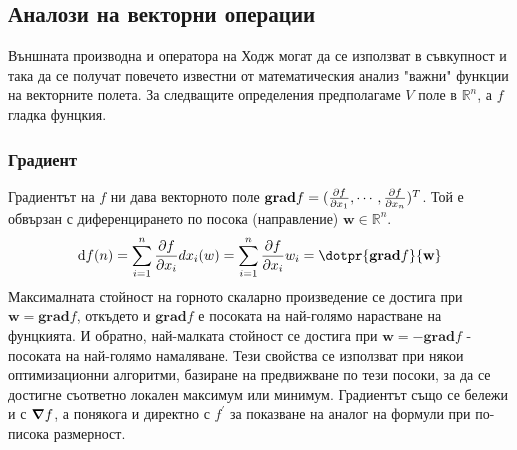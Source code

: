 \documentclass[12pt]{article}
\begin{document}
\begin{large}
\subsection{Аналози на векторни операции}
Външната производна и оператора на Ходж могат да се използват в съвкупност и така да се получат повечето известни от математическия анализ "важни" функции на векторните полета.
За следващите определения предполагаме $V$ поле в $\mathbb{R}^n$, а $f$ гладка фунцкия.

\subsubsection*{Градиент}
Градиентът на $f$ ни дава векторното поле $\mathbf{grad} f=(\pdv{f}{x_1},\cdots,\pdv{f}{x_n})^T$. Той е обвързан с диференцирането по посока (направление) $\mathbf{w} \in \mathbb{R}^n$.
\[
  \dd f(n)=\sum_{i=1}^{n} \pdv{f}{x_i}dx_i(w)=\sum_{i=1}^{n} \pdv{f}{x_i}w_i=\dotpr{\mathbf{grad}f}{\mathbf{w}}
  \]
Максималната стойност на горното скаларно произведение се достига при $\mathbf{w}=\mathbf{grad}f$, откъдето и $\mathbf{grad}f$ е посоката на най-голямо нарастване на фунцкията. И обратно, най-малката стойност се достига при $\mathbf{w}=-\mathbf{grad}f$ - посоката на най-голямо намаляване. Тези свойства се използват при някои оптимизационни алгоритми, базиране на предвижване по тези посоки, за да се достигне съответно локален максимум или минимум.
Градиентът също се бележи и с $\grad f$, а понякога и директно с $f^\prime$ за показване на аналог на формули при по-писока размерност.


\end{large}
\end{document}
